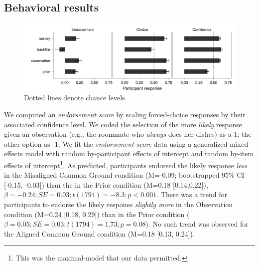 \documentclass[10pt,letterpaper]{article}
\begin{document}
\subsection{Behavioral results}


\begin{figure}
    \includegraphics[width=\textwidth]{expt1-3responses}
    \caption{Dotted lines denote chance levels.}
  \label{fig:expt1-all}
\end{figure}



We computed an \emph{endorsement score} by scaling forced-choice responses by their associated confidence level. 
We coded the selection of the more \emph{likely} response given an observation (e.g., the roommate who \emph{always} does her dishes) as a 1; the other option as -1.
We fit the \emph{endorsement score} data using a generalized mixed-effects model with random by-participant effects of intercept and random by-item effects of intercept\footnote{This was the maximal-model that our data permitted.}. 
As predicted, participants endorsed the likely response \emph{less} in the Misaligned Common Ground condition (M=-0.09; bootstrapped 95\% CI [-0.15, -0.03]) than the in the Prior condition (M=0.18 [0.14,0.22]), $\beta = -0.24; SE = 0.03; t(1794) = -8.3; p<0.001$.
There was a trend for participants to endorse the likely response \emph{slightly more} in the Observation condition (M=0.24 [0.18, 0.29]) than in the Prior condition ($\beta = 0.05; SE = 0.03; t(1794) = 1.73; p = 0.08$). 
No such trend was observed for the Aligned Common Ground condition (M=0.18 [0.13, 0.24]). 
\end{document}
